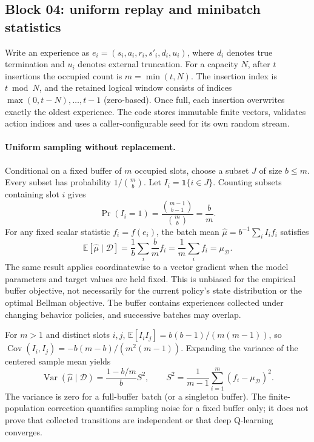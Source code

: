 \documentclass[11pt,a4paper]{article}
\newcommand{\E}{\mathbb E}
\newcommand{\one}{\mathbf 1}
\begin{document}
\subsection{Block 04: uniform replay and minibatch statistics}
Write an experience as $e_i=(s_i,a_i,r_i,s'_i,d_i,u_i)$, where $d_i$ denotes true termination and $u_i$ denotes external truncation. For a capacity $N$, after $t$ insertions the occupied count is $m=\min(t,N)$. The insertion index is $t\bmod N$, and the retained logical window consists of indices $\max(0,t-N),\ldots,t-1$ (zero-based). Once full, each insertion overwrites exactly the oldest experience. The code stores immutable finite vectors, validates action indices and uses a caller-configurable seed for its own random stream.

\paragraph{Uniform sampling without replacement.} Conditional on a fixed buffer of $m$ occupied slots, choose a subset $J$ of size $b\le m$. Every subset has probability $1/\binom{m}{b}$. Let $I_i=\one\{i\in J\}$. Counting subsets containing slot $i$ gives
\[
 \Pr(I_i=1)=\frac{\binom{m-1}{b-1}}{\binom{m}{b}}=\frac{b}{m}.
\]
For any fixed scalar statistic $f_i=f(e_i)$, the batch mean $\hat\mu=b^{-1}\sum_i I_i f_i$ satisfies
\[
 \E[\hat\mu\mid\mathcal D]=\frac1b\sum_i\frac bm f_i
 =\frac1m\sum_i f_i=\mu_{\mathcal D}.
\]
The same result applies coordinatewise to a vector gradient when the model parameters and target values are held fixed. This is unbiased for the empirical buffer objective, not necessarily for the current policy's state distribution or the optimal Bellman objective. The buffer contains experiences collected under changing behavior policies, and successive batches may overlap.

For $m>1$ and distinct slots $i,j$, $\E[I_iI_j]=b(b-1)/(m(m-1))$, so $\operatorname{Cov}(I_i,I_j)=-b(m-b)/(m^2(m-1))$. Expanding the variance of the centered sample mean yields
\[
 \operatorname{Var}(\hat\mu\mid\mathcal D)
 =\frac{1-b/m}{b}S^2,\qquad
 S^2=\frac{1}{m-1}\sum_{i=1}^m(f_i-\mu_{\mathcal D})^2.
\]
The variance is zero for a full-buffer batch (or a singleton buffer). The finite-population correction quantifies sampling noise for a fixed buffer only; it does not prove that collected transitions are independent or that deep Q-learning converges.
\end{document}
